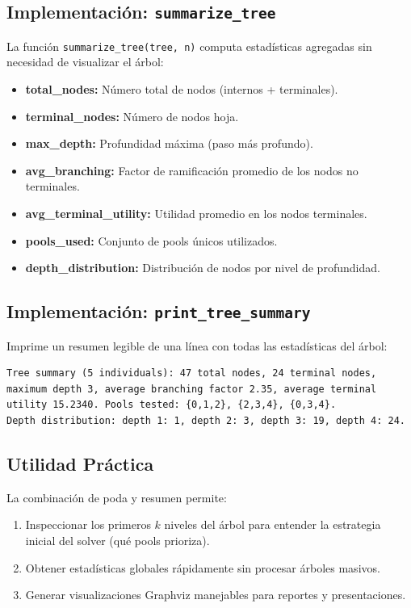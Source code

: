\documentclass[11pt, a4paper]{article}
\begin{document}
\subsection{Implementaci\'on: \texttt{summarize\_tree}}
La funci\'on \texttt{summarize\_tree(tree, n)} computa estad\'isticas
agregadas sin necesidad de visualizar el \'arbol:

\begin{itemize}[nosep]
    \item \textbf{total\_nodes:} N\'umero total de nodos (internos + terminales).
    \item \textbf{terminal\_nodes:} N\'umero de nodos hoja.
    \item \textbf{max\_depth:} Profundidad m\'axima (paso m\'as profundo).
    \item \textbf{avg\_branching:} Factor de ramificaci\'on promedio de los
    nodos no terminales.
    \item \textbf{avg\_terminal\_utility:} Utilidad promedio en los nodos
    terminales.
    \item \textbf{pools\_used:} Conjunto de pools \'unicos utilizados.
    \item \textbf{depth\_distribution:} Distribuci\'on de nodos por nivel
    de profundidad.
\end{itemize}

\subsection{Implementaci\'on: \texttt{print\_tree\_summary}}
Imprime un resumen legible de una l\'inea con todas las estad\'isticas
del \'arbol:
\begin{verbatim}
Tree summary (5 individuals): 47 total nodes, 24 terminal nodes,
maximum depth 3, average branching factor 2.35, average terminal
utility 15.2340. Pools tested: {0,1,2}, {2,3,4}, {0,3,4}.
Depth distribution: depth 1: 1, depth 2: 3, depth 3: 19, depth 4: 24.
\end{verbatim}

\subsection{Utilidad Pr\'actica}
La combinaci\'on de poda y resumen permite:
\begin{enumerate}[nosep]
    \item Inspeccionar los primeros $k$ niveles del \'arbol para entender
    la estrategia inicial del solver (qu\'e pools prioriza).
    \item Obtener estad\'isticas globales r\'apidamente sin procesar
    \'arboles masivos.
    \item Generar visualizaciones Graphviz manejables para reportes
    y presentaciones.
\end{enumerate}
\end{document}
